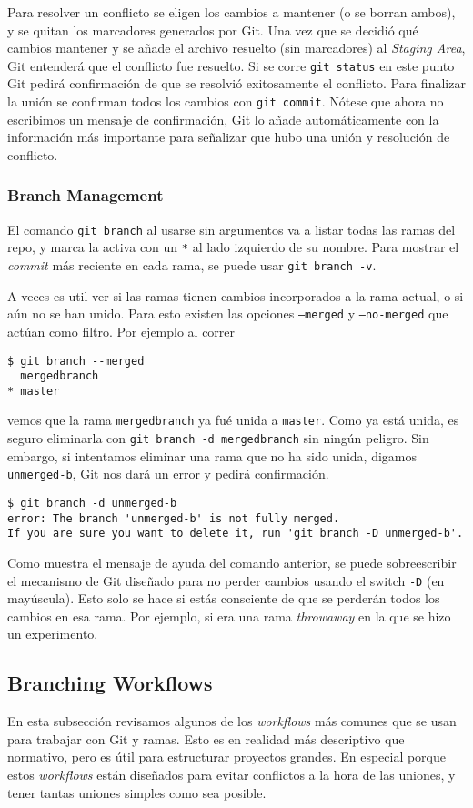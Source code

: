 \documentclass[spanish, 12pt, a4paper]{article}
\begin{document}
Para resolver un conflicto se eligen los cambios a mantener (o se borran ambos),
y se quitan los marcadores generados por Git.
Una vez que se decidió qué cambios mantener y se añade el archivo resuelto (sin
marcadores) al \textit{Staging Area}, Git entenderá que el conflicto fue
resuelto.
Si se corre \texttt{git status} en este punto Git pedirá confirmación de que se
resolvió exitosamente el conflicto.
Para finalizar la unión se confirman todos los cambios con \texttt{git commit}.
Nótese que ahora no escribimos un mensaje de confirmación, Git lo añade
automáticamente con la información más importante para señalizar que hubo una
unión y resolución de conflicto.

\subsubsection{Branch Management}
El comando \texttt{git branch} al usarse sin argumentos va a listar todas las
ramas del repo, y marca la activa con un \texttt{*} al lado izquierdo de su
nombre.
Para mostrar el \textit{commit} más reciente en cada rama, se puede usar
\texttt{git branch -v}.

A veces es util ver si las ramas tienen cambios incorporados a la rama actual, o
si aún no se han unido.
Para esto existen las opciones \texttt{--merged} y \texttt{--no-merged} que
actúan como filtro.
Por ejemplo al correr
\begin{lstlisting}
$ git branch --merged
  mergedbranch
* master
\end{lstlisting}
vemos que la rama \texttt{mergedbranch} ya fué unida a \texttt{master}.
Como ya está unida, es seguro eliminarla con \texttt{git branch -d mergedbranch}
sin ningún peligro.
Sin embargo, si intentamos eliminar una rama que no ha sido unida, digamos
\texttt{unmerged-b}, Git nos dará un error y pedirá confirmación.
\begin{lstlisting}
$ git branch -d unmerged-b
error: The branch 'unmerged-b' is not fully merged.
If you are sure you want to delete it, run 'git branch -D unmerged-b'.
\end{lstlisting}

Como muestra el mensaje de ayuda del comando anterior, se puede sobreescribir el
mecanismo de Git diseñado para no perder cambios usando el switch \texttt{-D}
(en mayúscula).
Esto solo se hace si estás consciente de que se perderán todos los cambios en
esa rama.
Por ejemplo, si era una rama \textit{throwaway} en la que se hizo un
experimento.

\subsection{Branching Workflows}
En esta subsección revisamos algunos de los \textit{workflows} más comunes que
se usan para trabajar con Git y ramas.
Esto es en realidad más descriptivo que normativo, pero es útil para estructurar
proyectos grandes.
En especial porque estos \textit{workflows} están diseñados para evitar
conflictos a la hora de las uniones, y tener tantas uniones simples como sea
posible.
\end{document}
